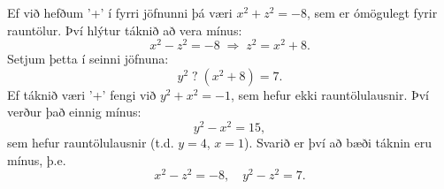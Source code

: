 Ef við hefðum '+' í fyrri jöfnunni þá væri $x^2 + z^2 = -8$, sem er ómögulegt
fyrir rauntölur. Því hlýtur táknið að vera mínus:
\[
x^2 - z^2 = -8 \;\Rightarrow\; z^2 = x^2 + 8.
\]
Setjum þetta í seinni jöfnuna:
\[
y^2\; ?\; (x^2+8) = 7.
\]
Ef táknið væri '+' fengi við $y^2+x^2= -1$, sem hefur ekki rauntölulausnir.
Því verður það einnig mínus:
\[
y^2 - x^2 = 15,
\]
sem hefur rauntölulausnir (t.d. $y=4$, $x=1$).
Svarið er því að bæði táknin eru mínus, þ.e.
\[
x^2 - z^2 = -8,\quad y^2 - z^2 = 7.
\]